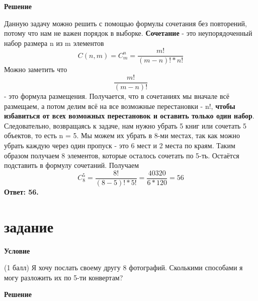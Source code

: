 \documentclass[a4paper]{article}
\begin{document}
\begin{center}
\begin{flushleft}
    \textbf{{\Large Решение}}
\end{flushleft}

\begin{flushleft}
    Данную задачу можно решить с помощью формулы сочетания без повторений, потому что нам не важен порядок в выборке. \textbf{Сочетание} - это неупорядоченный набор размера n из m элементов \[C(n, m)=C_m^n=\frac{m!}{(m - n)!*n!}\]
    Можно заметить что \[\frac{m!}{(m - n)!}\] - это формула размещения.
    Получается, что в сочетаниях мы вначале всё размещаем, а потом делим всё на все возможные перестановки - n!, \textbf{чтобы избавиться от всех возможных перестановок и оставить только один набор}. Следовательно, возвращаясь к задаче, нам нужно убрать 5 книг или сочетать 5 объектов, то есть n = 5. Мы можем их убрать в 8-ми местах, так как можно убрать каждую через один пропуск - это 6 мест и 2 места по краям. Таким образом получаем 8 элементов, которые осталось сочетать по 5-ть. Остаётся подставить в формулу сочетаний. Получаем \[C_8^5=\frac{8!}{(8 - 5)!*5!}=\frac{40320}{6*120}=56\]
    \textbf{Ответ: 56.}
\end{flushleft}

\newpage

\section{задание}

\begin{flushleft}
    \textbf{{\Large Условие}}
\end{flushleft}
(1 балл) Я хочу послать своему другу 8 фотографий. Сколькими способами я могу разложить их по 5-ти конвертам?
\hfill \break

\begin{flushleft}
    \textbf{{\Large Решение}}
\end{flushleft}


\end{center}
\end{document}
